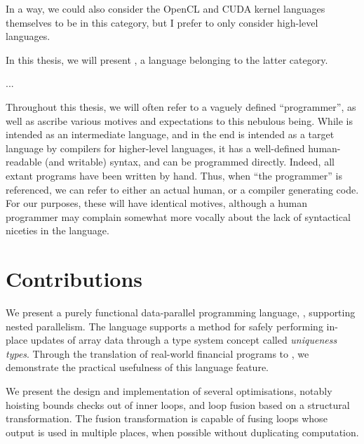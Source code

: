 \begin{description}
\begin{description}
  In a way, we could also consider the OpenCL and CUDA kernel
  languages themselves to be in this category, but I prefer to only
  consider high-level languages.
\end{description}
\end{description}

In this thesis, we will present \LO{}, a language belonging to the
latter category.

... 

Throughout this thesis, we will often refer to a vaguely defined
``programmer'', as well as ascribe various motives and expectations to
this nebulous being.  While \LO{} is intended as an intermediate
language, and in the end is intended as a target language by compilers
for higher-level languages, it has a well-defined human-readable (and
writable) syntax, and can be programmed directly.  Indeed, all extant
\LO{} programs have been written by hand.  Thus, when ``the
programmer'' is referenced, we can refer to either an actual human, or
a compiler generating \LO{} code.  For our purposes, these will have
identical motives, although a human programmer may complain somewhat
more vocally about the lack of syntactical niceties in the language.

\section{Contributions}

We present a purely functional data-parallel programming language,
\LO{}, supporting nested parallelism.  The language supports a method
 for safely performing in-place updates of array data through
a type system concept called \textit{uniqueness types}.  Through the
translation of real-world financial programs to \LO{}, we demonstrate
the practical usefulness of this language feature.

We present the design and implementation of several optimisations,
notably hoisting bounds checks out of inner loops, and loop fusion
based on a structural transformation.  The fusion transformation is
capable of fusing loops whose output is used in multiple places, when
possible without duplicating computation.

